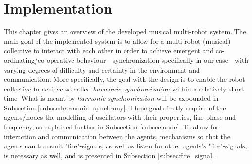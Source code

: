 \chapter{Implementation}





This chapter gives an overview of the developed musical multi-robot system. The main goal of the implemented system is to allow for a multi-robot (musical) collective to interact with each other in order to achieve emergent and co-ordinating/co-operative behaviour—synchronization specifically in our case—with varying degrees of difficulty and certainty in the environment and communication. More specifically, the goal with the design is to enable the robot collective to achieve so-called \textit{harmonic synchronization} within a relatively short time. What is meant by \textit{harmonic synchronization} will be expounded in Subsection \ref{subsec:harmonic_synchrony}. These goals firstly require of the agents/nodes the modelling of oscillators with their properties, like phase and frequency, as explained further in Subsection \ref{subsec:node}. To allow for interaction and communication between the agents, mechanisms so that the agents can transmit "fire"-signals, as well as listen for other agents's "fire"-signals, is necessary as well, and is presented in Subsection \ref{subsec:fire_signal}.














